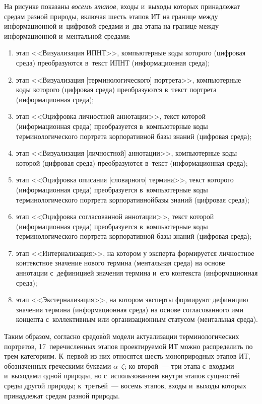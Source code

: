 \begin{multicols}{2}
  На рисунке показаны \textit{восемь этапов}, входы и~выходы которых 
принадлежат средам разной природы, включая шесть этапов ИТ на границе 
между информационной и~цифровой средами и~два этапа на границе между 
информационной и~ментальной средами:
  \begin{enumerate}[(1)]
  \item этап <<Визуализация ИПНТ>>, компьютерные коды которого 
(циф\-ро\-вая среда) преобразуются в~текст ИПНТ (информационная среда);
  \item этап <<Визуализация [терминологического] портрета>>, 
компьютерные коды которого (циф\-ро\-вая среда) преобразуются в~текст 
портрета (информационная среда);
  \item этап <<Оцифровка личностной аннотации>>, текст которой 
(информационная среда) преобразуется в~компьютерные коды 
терминологического портрета корпоративной базы знаний (циф\-ро\-вая среда);
  \item этап <<Визуализация [личностной] аннотации>>, компьютерные 
коды которой (циф\-ро\-вая среда) преобразуются в~текст (информационная 
среда);
  \item этап <<Оцифровка описания [словарного] термина>>, текст которого 
(информационная среда) преобразуется в~компьютерные коды 
терминологического портрета корпоративной\linebreak базы знаний (циф\-ро\-вая среда);
  \item этап <<Оцифровка согласованной аннотации>>, текст которой 
(информационная среда) преобразуется в~компьютерные коды 
терминологического портрета корпоративной базы знаний (циф\-ро\-вая среда);
  \item этап <<Интернализация>>, на котором у эксперта формируется 
личностное контекстное значение нового термина (ментальная среда) на 
основе аннотации с~дефиницией значения термина и~его контекста 
(информационная среда);
  \item этап <<Экстернализация>>, на котором эксперты формируют 
дефиницию значения термина (информационная среда) на основе 
согласованного ими концепта с~коллективным или организационным 
статусом (ментальная среда).
  \end{enumerate}
  
  Таким образом, согласно средов$\acute{\mbox{о}}$й модели актуализации 
терминологических портретов, 17~перечисленных этапов проектируемой ИТ 
можно распределить по трем категориям. К~первой из них относятся шесть 
моноприродных этапов ИТ, обозначенных греческими буквами  
$\alpha$--$\zeta$; ко второй~--- три этапа с~входами и~выходами одной 
природы, но с~использованием внут\-ри этапов сущностей среды другой 
природы; к~третьей~--- восемь этапов, входы и~выходы которых принадлежат 
средам разной природы. 
  

\end{multicols}
